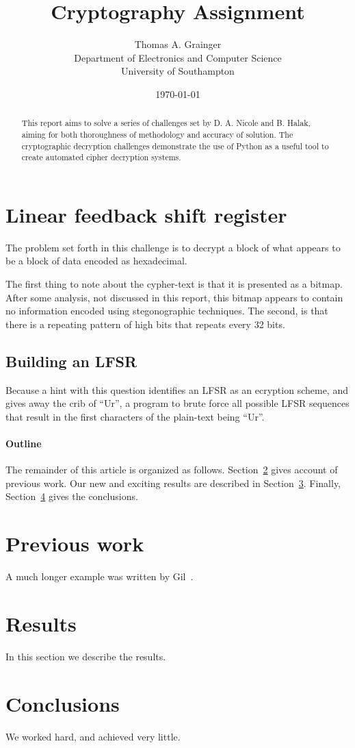 \documentclass[pdftex, 12pt, a4paper]{article}
\title{Cryptography Assignment}
\author{
        Thomas A. Grainger \\
                Department of Electronics and Computer Science\\
        University of Southampton\\
}
\date{\today}
\begin{document}
\maketitle

\begin{abstract}
This report aims to solve a series of challenges set by D. A. Nicole and B. Halak\cite{instructions}, aiming for both thoroughness of methodology and accuracy of solution.  The cryptographic decryption challenges demonstrate the use of Python as a useful tool to create automated cipher decryption systems.
\end{abstract}

\tableofcontents

\section{Linear feedback shift register}

The problem set forth in this challenge is to decrypt a block of what appears to be a block of data encoded as hexadecimal.

The first thing to note about the cypher-text is that it is presented as a bitmap. After some analysis, not discussed in this report, this bitmap appears to contain no information encoded using stegonographic techniques.  The second, is that there is a repeating pattern of high bits that repeats every 32 bits.

\subsection{Building an LFSR}
Because a hint with this question identifies an LFSR as an ecryption scheme, and gives away the crib of ``Ur'', a program to brute force all possible LFSR sequences that result in the first characters of the plain-text being ``Ur''.



\paragraph{Outline}
The remainder of this article is organized as follows.
Section~\ref{previous work} gives account of previous work.
Our new and exciting results are described in Section~\ref{results}.
Finally, Section~\ref{conclusions} gives the conclusions.

\section{Previous work}\label{previous work}
A much longer \LaTeXe{} example was written by Gil~\cite{Gil:02}.

\section{Results}\label{results}
In this section we describe the results.

\section{Conclusions}\label{conclusions}
We worked hard, and achieved very little.



\end{document}
